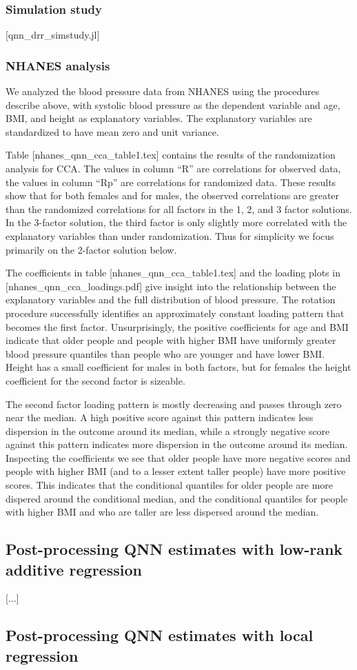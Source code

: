 \subsubsection{Simulation study}

[qnn_drr_simstudy.jl]

\subsubsection{NHANES analysis}

We analyzed the blood pressure data from NHANES using the procedures
describe above, with systolic blood pressure as the dependent variable
and age, BMI, and height as explanatory variables.  The explanatory
variables are standardized to have mean zero and unit variance.

Table [nhanes_qnn_cca_table1.tex] contains the results of the
randomization analysis for CCA.  The values in column ``R'' are
correlations for observed data, the values in column ``Rp'' are
correlations for randomized data.  These results show that for both
females and for males, the observed correlations are greater than
the randomized correlations for all factors in the 1, 2, and 3 factor
solutions.  In the 3-factor solution, the third factor is only slightly
more correlated with the explanatory variables than under randomization.
Thus for simplicity we focus primarily on the 2-factor solution below.

The coefficients in table [nhanes_qnn_cca_table1.tex] and the loading
plots in [nhanes_qnn_cca_loadings.pdf] give insight into the relationship
between the explanatory variables and the full distribution of blood
pressure. The rotation procedure successfully identifies an approximately
constant loading pattern that becomes the first factor.  Unsurprisingly,
the positive coefficients for age and BMI indicate that older people and
people with higher BMI have uniformly greater blood pressure quantiles
than people who are younger and have lower BMI. Height has a small
coefficient for males in both factors, but for females the height
coefficient for the second factor is sizeable.

The second factor loading pattern is mostly decreasing and passes through
zero near the median.  A high positive score against this pattern
indicates less dispersion in the outcome around its median, while a
strongly negative score against this pattern indicates more dispersion in
the outcome around its median.  Inspecting the coefficients we see that
older people have more negative scores and people with higher BMI (and to
a lesser extent taller people) have more positive scores.  This indicates
that the conditional quantiles for older people are more dispered around
the conditional median, and the conditional quantiles for people with
higher BMI and who are taller are less dispersed around the median.

\subsection{Post-processing QNN estimates with low-rank additive
regression}

[...]

\subsection{Post-processing QNN estimates with local regression}
